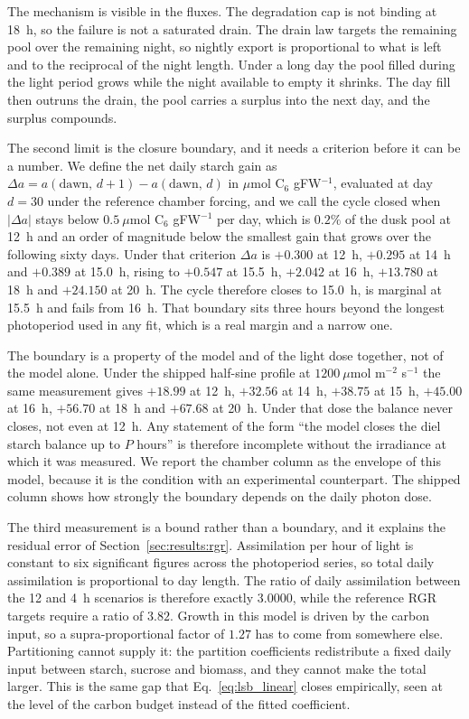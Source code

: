 The mechanism is visible in the fluxes. The degradation cap is not binding at
18~h, so the failure is not a saturated drain. The drain law targets the
remaining pool over the remaining night, so nightly export is proportional to
what is left and to the reciprocal of the night length. Under a long day the
pool filled during the light period grows while the night available to empty it
shrinks. The day fill then outruns the drain, the pool carries a surplus into
the next day, and the surplus compounds.

The second limit is the closure boundary, and it needs a criterion before it can
be a number. We define the net daily starch gain as
$\Delta a = a(\text{dawn},\,d{+}1) - a(\text{dawn},\,d)$ in
$\mu$mol C$_6$ gFW$^{-1}$, evaluated at day $d = 30$ under the reference chamber
forcing, and we call the cycle closed when $|\Delta a|$ stays below
$0.5~\mu$mol C$_6$ gFW$^{-1}$ per day, which is $0.2\%$ of the dusk pool at 12~h
and an order of magnitude below the smallest gain that grows over the following
sixty days. Under that criterion $\Delta a$ is $+0.300$ at 12~h, $+0.295$ at
14~h and $+0.389$ at 15.0~h, rising to $+0.547$ at 15.5~h, $+2.042$ at 16~h,
$+13.780$ at 18~h and $+24.150$ at 20~h. The cycle therefore closes to 15.0~h,
is marginal at 15.5~h and fails from 16~h. That boundary sits three hours beyond the longest photoperiod
used in any fit, which is a real margin and a narrow one.

The boundary is a property of the model and of the light dose together, not of
the model alone. Under the shipped half-sine profile at
$1200~\mu\mathrm{mol}$ m$^{-2}$ s$^{-1}$ the same measurement gives $+18.99$
at 12~h, $+32.56$ at 14~h, $+38.75$ at 15~h, $+45.00$ at 16~h, $+56.70$ at
18~h and $+67.68$ at 20~h. Under that dose the balance never closes, not even
at 12~h. Any statement of the form ``the model closes the diel starch balance
up to $P$ hours'' is therefore incomplete without the irradiance at which it
was measured. We report the chamber column as the envelope of this model, because it is the
condition with an experimental counterpart. The shipped column shows how
strongly the boundary depends on the daily photon dose.

The third measurement is a bound rather than a boundary, and it explains the
residual error of Section~\ref{sec:results:rgr}. Assimilation per hour of light
is constant to six significant figures across the photoperiod series, so total
daily assimilation is proportional to day length. The ratio of daily
assimilation between the 12 and 4~h scenarios is therefore exactly
$3.0000$, while the reference RGR targets require a ratio of $3.82$. Growth in
this model is driven by the carbon input, so a supra-proportional factor of
$1.27$ has to come from somewhere else. Partitioning cannot supply it: the
partition coefficients redistribute a fixed daily input between starch,
sucrose and biomass, and they cannot make the total larger. This is the same
gap that Eq.~\ref{eq:lsb_linear} closes empirically, seen at the level of the
carbon budget instead of the fitted coefficient.

